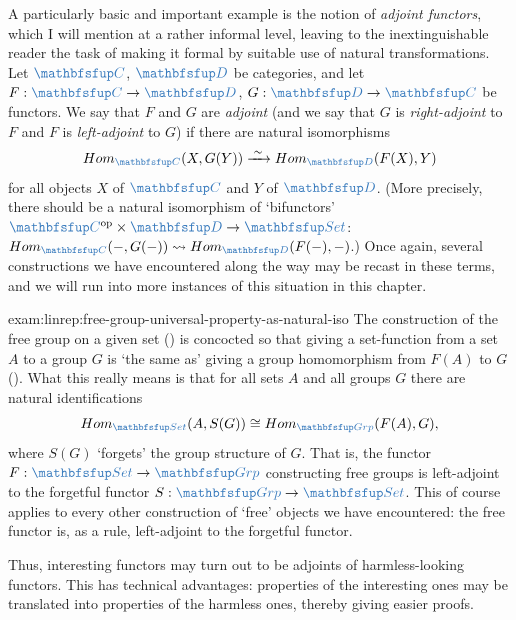 A particularly basic and important example is the notion of
\emph{adjoint functors}, which I will mention at a rather informal
level, leaving to the inextinguishable reader the task of making it
formal by suitable use of natural transformations. Let $\categ{C}$,
$\categ{D}$ be categories, and let $F : \categ{C} \to \categ{D}$,
$G : \categ{D} \to \categ{C}$ be functors. We say that $F$ and $G$ are
\emph{adjoint} (and we say that $G$ is \emph{right-adjoint} to $F$ and
$F$ is \emph{left-adjoint} to $G$) if there are natural isomorphisms
\[
  \Hom_{\categ{C}}(X, G(Y)) \xrightarrow{\;\sim\;}
  \Hom_{\categ{D}}(F(X), Y)
\]
for all objects $X$ of $\categ{C}$ and $Y$ of $\categ{D}$. (More
precisely, there should be a natural isomorphism of `bifunctors'
$\categ{C}^{\mathrm{op}} \times \categ{D} \to \categ{Set}$:
$\Hom_{\categ{C}}(\mathord{-}, G(\mathord{-})) \leadsto
\Hom_{\categ{D}}(F(\mathord{-}), \mathord{-})$.) Once again, several
constructions we have encountered along the way may be recast in these
terms, and we will run into more instances of this situation in this
chapter.
\begin{exam}{}{exam:linrep:free-group-universal-property-as-natural-iso}
  The construction of the free group on a given set
  () is concocted so that giving a
  set-function from a set $A$ to a group $G$ is `the same as' giving a
  group homomorphism from $F(A)$ to $G$
  (). What this really means
  is that for all sets $A$ and all groups $G$ there are natural
  identifications
  \[
    \Hom_{\categ{Set}}(A, S(G)) \cong \Hom_{\categ{Grp}}(F(A), G),
  \]
  where $S(G)$ `forgets' the group structure of $G$. That is, the
  functor $F : \categ{Set} \to \categ{Grp}$ constructing free groups
  is left-adjoint to the forgetful functor
  $S : \categ{Grp} \to \categ{Set}$. This of course applies to every
  other construction of `free' objects we have encountered: the free
  functor is, as a rule, left-adjoint to the forgetful functor.
\end{exam}
Thus, interesting functors may turn out to be adjoints of
harmless-looking functors. This has technical advantages: properties
of the interesting ones may be translated into properties of the
harmless ones, thereby giving easier proofs.

